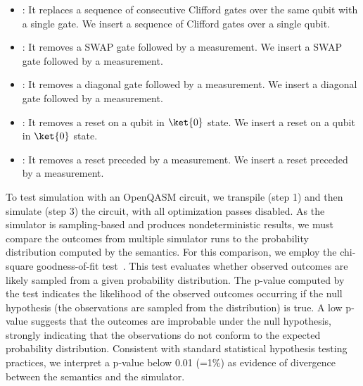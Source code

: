 \begin{itemize}[leftmargin=*]
	\item {}:
	      It replaces a sequence of consecutive Clifford gates over the same qubit with a
	      single gate.
	      We insert a sequence of Clifford gates over a single qubit.
	\item {}:
	      It removes a SWAP gate followed by a measurement.
	      We insert a SWAP gate followed by a measurement.
	\item {}:
	      It removes a diagonal gate followed by a measurement.
	      We insert a diagonal gate followed by a measurement.
	\item {}:
	      It removes a reset on a qubit in $\ket{0}$ state.
	      We insert a reset on a qubit in $\ket{0}$ state.
	\item {}:
	      It removes a reset preceded by a measurement.
	      We insert a reset preceded by a measurement.
\end{itemize}

To test simulation with an OpenQASM circuit, we transpile (step 1) and then
simulate (step 3) the circuit, with all optimization passes disabled.
%
As the simulator is sampling-based and produces nondeterministic results, we
must compare the outcomes from multiple simulator runs to the probability
distribution computed by the semantics.
%
For this comparison, we employ the chi-square goodness-of-fit
test~\cite{pearson1900criterion}.
%
This test evaluates whether observed outcomes are likely sampled from a given
probability distribution.
%
The p-value computed by the test indicates the likelihood of the observed
outcomes occurring if the null hypothesis (the observations are sampled from
the distribution) is true.
%
A low p-value suggests that the outcomes are improbable under the null
hypothesis, strongly indicating that the observations do not conform to the
expected probability distribution.
%
Consistent with standard statistical hypothesis testing practices, we interpret
a p-value below 0.01 (=1\%) as evidence of divergence between the semantics and
the simulator.

